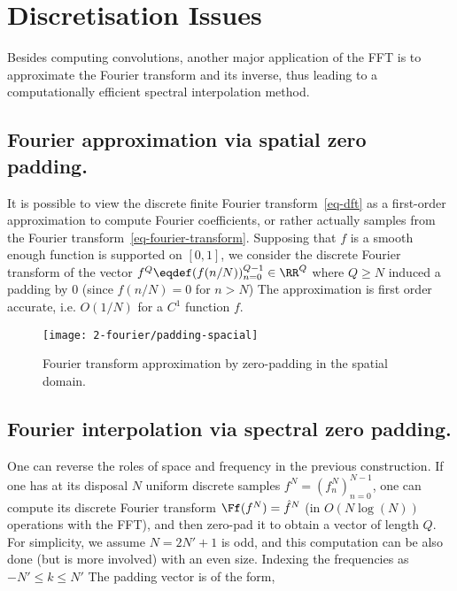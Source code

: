 \section{Discretisation Issues}
\label{sec-fourier-discretization}

Besides computing convolutions, another major application of the FFT is to approximate the Fourier transform and its inverse, thus leading to a computationally efficient spectral interpolation method.


\subsection{Fourier approximation via spatial zero padding.}

It is possible to view the discrete finite Fourier transform~\eqref{eq-dft} as a first-order approximation to compute Fourier coefficients, or rather actually samples from the Fourier transform~\eqref{eq-fourier-transform}. Supposing that $f$ is a smooth enough function is supported on $[0,1]$, we consider the discrete Fourier transform of the vector $f^Q \eqdef (f(n/N))_{n=0}^{Q-1} \in \RR^Q$  where $Q \geq N$ induced a padding by $0$ (since $f(n/N)=0$ for $n > N$)
The approximation is first order accurate, i.e. $O(1/N)$ for a $C^1$ function $f$. 

\begin{figure}
\centering
\texttt{[image: 2-fourier/padding-spacial]}
\caption{\label{fig-padding-spacial}
Fourier transform approximation by zero-padding in the spatial domain.
}
\end{figure}


\subsection{Fourier interpolation via spectral zero padding.}

One can reverse the roles of space and frequency in the previous construction. 
%
If one has at its disposal $N$ uniform discrete samples $f^N=(f^N_n)_{n=0}^{N-1}$, one can compute its discrete Fourier transform $\Ff(f^N) = \hat f^N$ (in $O(N \log(N))$ operations with the FFT), 
and then zero-pad it to obtain a vector of length $Q$.
%
For simplicity, we assume $N=2N'+1$ is odd, and this computation can be also done (but is more involved) with an even size.
%
Indexing the frequencies as $-N' \leq k \leq N'$ The padding vector is of the form, 

